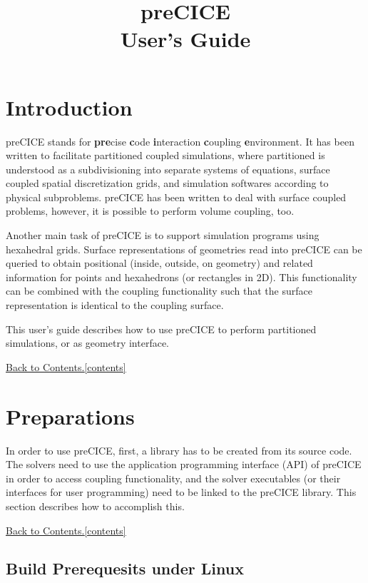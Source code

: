 \documentclass[11pt, oneside]{scrartcl}
\title{\Large{preCICE} \\[5mm] \Huge{User's Guide}}
\newcommand{\backtocontents}{\hyperref[contents]{Back to Contents.\ref*{contents}}}
\begin{document}
\maketitle
\tableofcontents \label{contents}

\section{Introduction}

preCICE stands for \textbf{pre}cise \textbf{c}ode \textbf{i}nteraction \textbf{c}oupling \textbf{e}nvironment. It has been written to facilitate partitioned coupled simulations, where partitioned is understood as a subdivisioning into separate systems of equations, surface coupled spatial discretization grids, and simulation softwares according to physical subproblems. preCICE has been written to deal with surface coupled problems, however, it is possible to perform volume coupling, too.

Another main task of preCICE is to support simulation programs using hexahedral grids. Surface representations of geometries read into preCICE can be queried to obtain positional (inside, outside, on geometry) and related information for points and hexahedrons (or rectangles in 2D). This functionality can be combined with the coupling functionality such that the surface representation is identical to the coupling surface.

This user's guide describes how to use preCICE to perform partitioned simulations, or as geometry interface.

\backtocontents

\section{Preparations}

In order to use preCICE, first, a library has to be created from its source code. The solvers need to use the application programming interface (API) of preCICE in order to access coupling functionality, and the solver executables (or their interfaces for user programming) need to be linked to the preCICE library. This section describes how to accomplish this.

\backtocontents

\subsection{Build Prerequesits under Linux}
\end{document}
